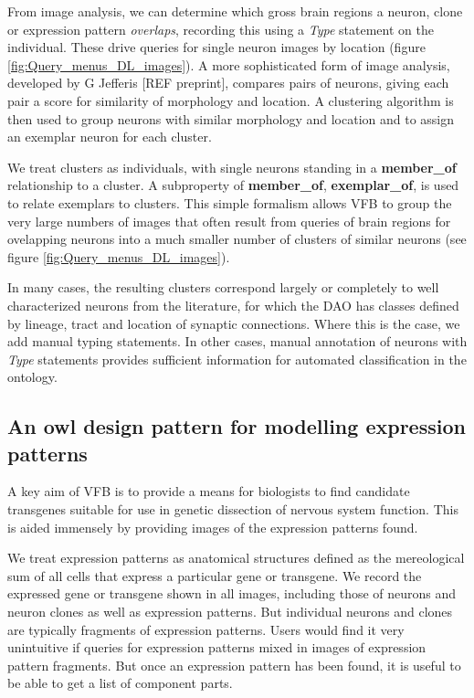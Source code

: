 \documentclass[runningheads,a4paper]{llncs}
\begin{document}
From image analysis, we can determine which gross brain regions a
neuron, clone or expression pattern \textit{overlaps}, recording this 
using a \textit{Type} statement on the individual.  These drive queries for
single neuron images by location (figure
\ref{fig:Query_menus_DL_images}). A more sophisticated form of image
analysis, developed by G Jefferis [REF preprint], compares pairs of 
neurons,  giving each pair a score for similarity of morphology and
location.  A clustering algorithm is then used to group neurons with
similar morphology and location and to assign an exemplar neuron for
each cluster.  

We treat clusters as individuals, with single neurons standing in a
\textbf{member\_of} relationship to a cluster.  A subproperty of
\textbf{member\_of}, \textbf{exemplar\_of}, is used to relate
exemplars to clusters.  This simple formalism allows VFB to group the
very large numbers of images that often result from queries of brain
regions for ovelapping neurons into a much smaller number of clusters
of similar neurons (see figure \ref{fig:Query_menus_DL_images}).

In many cases, the resulting clusters correspond largely or completely
to well characterized neurons from the literature, for which the DAO
has classes defined by lineage, tract and location of synaptic
connections. Where this is the case, we add manual typing
statements. In other cases, manual annotation of neurons with
\textit{Type} statements provides sufficient information for automated
classification in the ontology.

\subsection{An owl design pattern for modelling expression patterns}

A key aim of VFB is to provide a means for biologists to find
candidate transgenes suitable for use in genetic dissection of nervous
system function. This is aided immensely by providing images of the
expression patterns found.

We treat expression patterns as anatomical structures defined as the
mereological sum of all cells that express a particular gene or
transgene. We record the expressed gene or transgene shown in all
images, including those of neurons and neuron clones as well as
expression patterns.  But individual neurons and clones are typically 
fragments of expression patterns. Users would find it very unintuitive
if queries for expression patterns mixed in images of expression
pattern fragments.   But once an expression pattern has been found, 
it is useful to be able to get a list of component parts.
\end{document}
